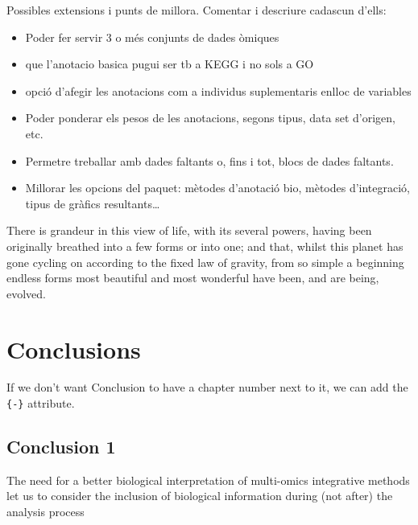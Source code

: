 \documentclass[a4paper, nobind]{templates/ociamthesis}
\providecommand{\tightlist}{%
  \setlength{\itemsep}{0pt}\setlength{\parskip}{0pt}}
\renewcommand{\chaptermark}[1]{\markboth{\thechapter. #1}{\thechapter. #1}}
\begin{document}
Possibles extensions i punts de millora. Comentar i descriure cadascun d'ells:

\begin{itemize}
\tightlist
\item
  Poder fer servir 3 o més conjunts de dades òmiques
\item
  que l'anotacio basica pugui ser tb a KEGG i no sols a GO
\item
  opció d'afegir les anotacions com a individus suplementaris enlloc de variables
\item
  Poder ponderar els pesos de les anotacions, segons tipus, data set d'origen, etc.
\item
  Permetre treballar amb dades faltants o, fins i tot, blocs de dades faltants.
\item
  Millorar les opcions del paquet: mètodes d'anotació bio, mètodes d'integració, tipus de gràfics resultants\ldots{}
\end{itemize}

\begin{savequote}
There is grandeur in this view of life, with its several powers, having
been originally breathed into a few forms or into one; and that, whilst
this planet has gone cycling on according to the fixed law of gravity,
from so simple a beginning endless forms most beautiful and most
wonderful have been, and are being, evolved.
\end{savequote}



\hypertarget{conclusions}{%
\chapter{Conclusions}\label{conclusions}}

\chaptermark{Conclusions}

If we don't want Conclusion to have a chapter number next to it, we can add the \texttt{\{-\}} attribute.

\hypertarget{conclusion-1}{%
\section*{Conclusion 1}\label{conclusion-1}}

The need for a better biological interpretation of multi-omics integrative methods let us to consider the inclusion of biological information during (not after) the analysis process
\end{document}
